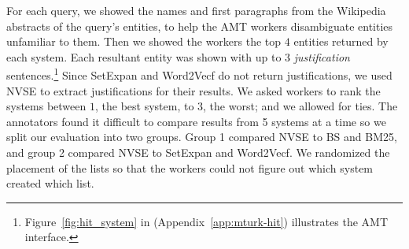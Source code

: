 \documentclass[a4paper]{article}
\newcommand{\appref}[1]{(Appendix~\ref{#1})}
\newcommand{\wTv}{Word2Vecf\xspace}
\newcommand{\setX}{SetExpan\xspace}
\newcommand{\nvge}{NVSE\xspace}
\begin{document}
%

For each query, we showed the names and first paragraphs from the Wikipedia abstracts of the query's entities, to help the AMT workers disambiguate entities unfamiliar to them. Then we showed the workers the top $4$ entities returned by each system.
Each resultant entity was shown with up to 3 \textit{justification} sentences.\footnote{Figure~\ref{fig:hit_system} in \appref{app:mturk-hit} illustrates the AMT interface.} Since \setX and \wTv do not return justifications, we used \nvge to extract justifications for their results. We asked workers to rank the systems between $1$, the best system, to $3$, the worst; and we allowed for ties. The annotators found it difficult to compare results from 5 systems at a time
so we split our evaluation into two groups. Group 1 compared \nvge to BS and BM25, and group 2
compared \nvge to \setX and \wTv. We randomized the placement of the lists so that the workers could not figure out which system created which list.
\end{document}
